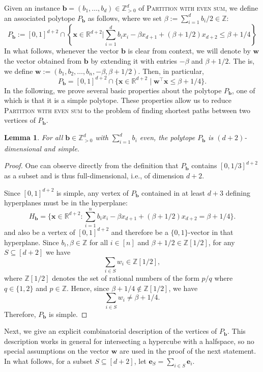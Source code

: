 \documentclass[centering,11pt,reqno]{amsart}
\newtheorem{lem}[theorem]{Lemma}
\theoremstyle{definition}
\begin{document}
Given an instance $\mathbf{b}=(b_1,\ldots,b_d)\in \mathbb{Z}_{>0}^d$ of \textsc{Partition with even sum}, we define an associated polytope $P_\mathbf{b}$ as follows, where we set $\beta := \sum_{i=1}^{d} b_{i}/2 \in \mathbb{Z}$:
\[P_{\mathbf{b}} := [0,1]^{d+2} \cap \left\{\mathbf{x} \in \mathbb{R}^{d+2}\bigg\vert \sum_{i=1}^{d} b_{i} x_{i} - \beta x_{d+1} + (\beta+1/2) x_{d+2} \leq \beta + 1/4\right\}  \]
In what follows, whenever the vector $\mathbf{b}$ is clear from context, we will denote by $\mathbf{w}$ the vector obtained from $\mathbf{b}$ by extending it with entries $-\beta$ and $\beta+1/2$. The is, we define $\mathbf{w} := (b_{1}, b_{2},\dots, b_{n}, -\beta, \beta + 1/2)$. Then, in particular, \[P_{\mathbf{b}} = [0,1]^{d+2} \cap \{\mathbf{x} \in \mathbb{R}^{d+2}\mid \mathbf{w}^{\intercal} \mathbf{x} \leq \beta + 1/4\}.\] 
In the following, we prove several basic properties about the polytope $P_\mathbf{b}$, one of which is that it is a simple polytope. These properties allow us to reduce \textsc{Partition  with even sum} to the problem of finding shortest paths between two vertices of $P_\mathbf{b}$. 
\begin{lem}
\label{lem:knapsacksimple}
For all $\mathbf{b} \in \mathbb{Z}^{d}_{>0}$ with $\sum_{i=1}^d b_i$ even, the polytope $P_{\mathbf{b}}$ is $(d+2)$-dimensional and simple. 
\end{lem}
\begin{proof}
One can observe directly from the definition that $P_\mathbf{b}$ contains $[0,1/3]^{d+2}$ as a subset and is thus full-dimensional, i.e., of dimension $d+2$.

Since $[0,1]^{d+2}$ is simple, any vertex of $P_{\mathbf{b}}$ contained in at least $d+3$ defining hyperplanes must be in the hyperplane:
\[H_{\mathbf{b}} = \{\mathbf{x} \in \mathbb{R}^{d+2}: \sum_{i=1}^{n} b_{i} x_{i} - \beta x_{d+1} + (\beta+1/2) x_{d+2} = \beta + 1/4\}.\]
and also be a vertex of $[0,1]^{d+2}$ and therefore be a $\{0,1\}$-vector in that hyperplane. Since $b_{i}, \beta \in \mathbb{Z}$ for all $i \in [n]$ and $\beta + 1/2 \in \mathbb{Z}[1/2]$, for any $S \subseteq [d+2]$ we have
\[\sum_{i \in S} w_{i} \in \mathbb{Z}[1/2], \]
where $\mathbb{Z}[1/2]$ denotes the set of rational numbers of the form $p/q$ where $q \in \{1,2\}$ and $p \in \mathbb{Z}$. Hence, since
$\beta + 1/4 \notin \mathbb{Z}[1/2]$, we have 
\[\sum_{i \in S} w_{i} \neq \beta + 1/4.\]
Therefore, $P_{\mathbf{b}}$ is simple. 
\end{proof}

Next, we give an explicit combinatorial description of the vertices of $P_\mathbf{b}$. This description works in general for intersecting a hypercube with a halfspace, so no special assumptions on the vector $\mathbf{w}$ are used in the proof of the next statement. In what follows, for a subset $S \subseteq [d+2]$, let $\mathbf{e}_{S} = \sum_{i \in S} \mathbf{e}_{i}$.
\end{document}
